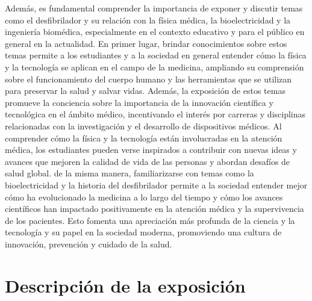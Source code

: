 Además, es fundamental comprender la importancia de exponer y discutir temas como el desfibrilador y su relación con la física médica, la bioelectricidad y la ingeniería biomédica, especialmente en el contexto educativo y para el público en general en la actualidad. En primer lugar, brindar conocimientos sobre estos temas permite a los estudiantes y a la sociedad en general entender cómo la física y la tecnología se aplican en el campo de la medicina, ampliando su comprensión sobre el funcionamiento del cuerpo humano y las herramientas que se utilizan para preservar la salud y salvar vidas. Además, la exposición de estos temas promueve la conciencia sobre la importancia de la innovación científica y tecnológica en el ámbito médico, incentivando el interés por carreras y disciplinas relacionadas con la investigación y el desarrollo de dispositivos médicos. Al comprender cómo la física y la tecnología están involucradas en la atención médica, los estudiantes pueden verse inspirados a contribuir con nuevas ideas y avances que mejoren la calidad de vida de las personas y abordan desafíos de salud global. de la misma manera, familiarizarse con temas como la bioelectricidad y la historia del desfibrilador permite a la sociedad entender mejor cómo ha evolucionado la medicina a lo largo del tiempo y cómo los avances científicos han impactado positivamente en la atención médica y la supervivencia de los pacientes. Esto fomenta una apreciación más profunda de la ciencia y la tecnología y su papel en la sociedad moderna, promoviendo una cultura de innovación, prevención y cuidado de la salud.

\newpage
\section{Descripción de la exposición}

